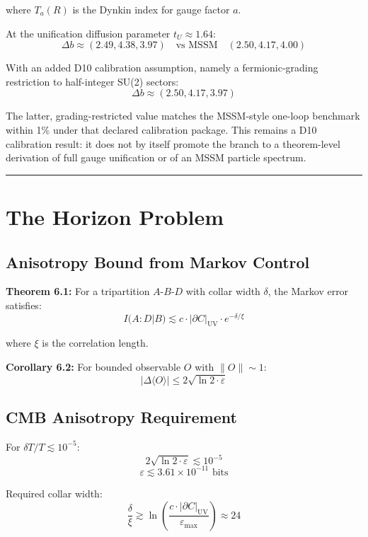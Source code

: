 where \(T_a(R)\) is the Dynkin index for gauge factor \(a\).

At the unification diffusion parameter \(t_U \approx 1.64\): \[\Delta b \approx (2.49, 4.38, 3.97) \quad \text{vs MSSM} \quad (2.50, 4.17, 4.00)\]

With an added D10 calibration assumption, namely a fermionic-grading restriction to half-integer SU(2) sectors: \[\Delta b \approx (2.50, 4.17, 3.97)\]

The latter, grading-restricted value matches the MSSM-style one-loop benchmark within 1\% under that declared calibration package. This remains a D10 calibration result: it does not by itself promote the branch to a theorem-level derivation of full gauge unification or of an MSSM particle spectrum.

\begin{center}\rule{0.5\linewidth}{0.5pt}\end{center}

\section{The Horizon Problem}\label{6-the-horizon-problem}

\subsection{Anisotropy Bound from Markov Control}\label{61-anisotropy-bound-from-markov-control}

\textbf{Theorem 6.1:} For a tripartition \(A\)-\(B\)-\(D\) with collar width \(\delta\), the Markov error satisfies: \[I(A:D|B) \lesssim c \cdot |\partial C|_{\text{UV}} \cdot e^{-\delta/\xi}\]

where \(\xi\) is the correlation length.

\textbf{Corollary 6.2:} For bounded observable \(O\) with \(\|O\| \sim 1\): \[|\Delta\langle O \rangle| \leq 2\sqrt{\ln 2 \cdot \varepsilon}\]

\subsection{CMB Anisotropy Requirement}\label{62-cmb-anisotropy-requirement}

For \(\delta T/T \lesssim 10^{-5}\): \[2\sqrt{\ln 2 \cdot \varepsilon} \lesssim 10^{-5}\] \[\varepsilon \lesssim 3.61 \times 10^{-11} \text{ bits}\]

Required collar width: \[\frac{\delta}{\xi} \gtrsim \ln\left(\frac{c \cdot |\partial C|_{\text{UV}}}{\varepsilon_{\text{max}}}\right) \approx 24\]


